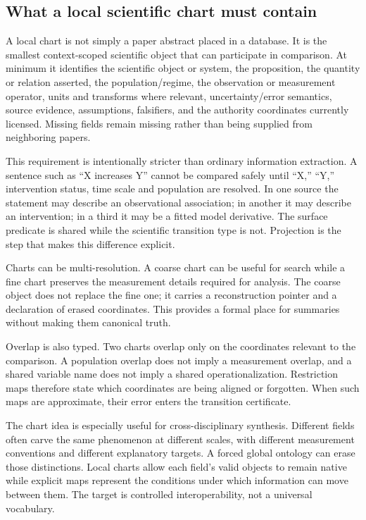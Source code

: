 \subsection{What a local scientific chart must contain}

A local chart is not simply a paper abstract placed in a database. It is the smallest context-scoped scientific object that can participate in comparison. At minimum it identifies the scientific object or system, the proposition, the quantity or relation asserted, the population/regime, the observation or measurement operator, units and transforms where relevant, uncertainty/error semantics, source evidence, assumptions, falsifiers, and the authority coordinates currently licensed. Missing fields remain missing rather than being supplied from neighboring papers.

This requirement is intentionally stricter than ordinary information extraction. A sentence such as ``X increases Y'' cannot be compared safely until ``X,'' ``Y,'' intervention status, time scale and population are resolved. In one source the statement may describe an observational association; in another it may describe an intervention; in a third it may be a fitted model derivative. The surface predicate is shared while the scientific transition type is not. Projection is the step that makes this difference explicit.

Charts can be multi-resolution. A coarse chart can be useful for search while a fine chart preserves the measurement details required for analysis. The coarse object does not replace the fine one; it carries a reconstruction pointer and a declaration of erased coordinates. This provides a formal place for summaries without making them canonical truth.

Overlap is also typed. Two charts overlap only on the coordinates relevant to the comparison. A population overlap does not imply a measurement overlap, and a shared variable name does not imply a shared operationalization. Restriction maps therefore state which coordinates are being aligned or forgotten. When such maps are approximate, their error enters the transition certificate.

The chart idea is especially useful for cross-disciplinary synthesis. Different fields often carve the same phenomenon at different scales, with different measurement conventions and different explanatory targets. A forced global ontology can erase those distinctions. Local charts allow each field's valid objects to remain native while explicit maps represent the conditions under which information can move between them. The target is controlled interoperability, not a universal vocabulary.

